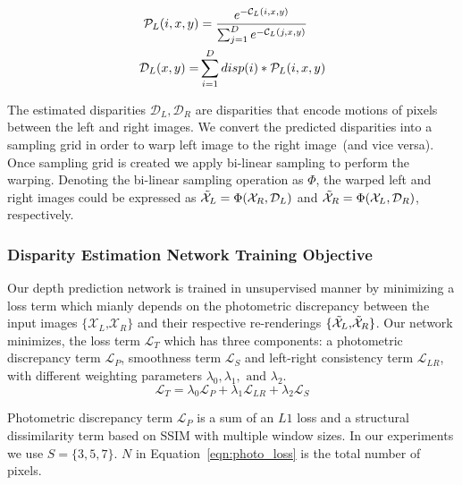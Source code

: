 \documentclass[runningheads]{llncs}
\begin{document}
\begin{equation}
    \begin{aligned}
        \mathcal{P}_{L}(i,x,y) &= \frac{e^{-\mathcal{C}_{L}(i,x,y)}}{\sum_{j=1}^{D}{e^{-\mathcal{C}_{L}(j,x,y)}}}
    \vspace{0.1cm} \\
    \mathcal{D}_{L}(x,y) =& \sum_{i=1}^{D}{disp(i)*\mathcal{P}_{L}(i,x,y)}
    \end{aligned}
    \label{eqn:softmin}
\end{equation}

The estimated disparities $\mathcal{D}_{L}, \mathcal{D}_{R}$ are disparities that encode motions of pixels between the left and right images. We convert the predicted disparities into a sampling grid in order to warp left image to the right image~(and vice versa). Once sampling grid is created we apply bi-linear sampling \cite{jaderberg2015spatial} to perform the warping. Denoting the bi-linear sampling operation as $\Phi$, the warped left and right images could be expressed as $\Tilde{\mathcal{X}}_{L} = \Phi(\mathcal{X}_{R}, \mathcal{D}_{L})$ and $\Tilde{\mathcal{X}}_{R} = \Phi(\mathcal{X}_{L}, \mathcal{D}_{R})$, respectively.

\subsubsection*{Disparity Estimation Network Training Objective}
Our depth prediction network is trained in unsupervised manner by minimizing a loss term which mianly depends on the photometric discrepancy between the input images $\{\mathcal{X}_{L} \text{,} \mathcal{X}_{R}\}$ and their respective re-renderings $\{\Tilde{\mathcal{X}}_{L} \text{,} \Tilde{\mathcal{X}}_{R}\}$. Our network minimizes, the loss term $\mathcal{L}_{T}$ which has three components: a photometric discrepancy term $\mathcal{L}_{P}$, smoothness term $\mathcal{L}_{S}$ and left-right consistency term $\mathcal{L}_{LR}$, with different weighting parameters $\lambda_{0}, \lambda_{1}, \text{ and } \lambda_{2}$.
\begin{equation}
    \mathcal{L}_{T} =  \lambda_{0} \mathcal{L}_{P} + \lambda_{1} \mathcal{L}_{LR} + \lambda_{2} \mathcal{L}_{S}
    \label{eqn:total}
\end{equation}

Photometric discrepancy term $\mathcal{L}_{P}$ is a sum of an $L1$ loss and a structural dissimilarity term based on SSIM \cite{wang2004image} with multiple window sizes. In our experiments we use $S = \lbrace 3, 5, 7 \rbrace$. $N$ in Equation~\ref{eqn:photo_loss} is the total number of pixels. 
\end{document}
